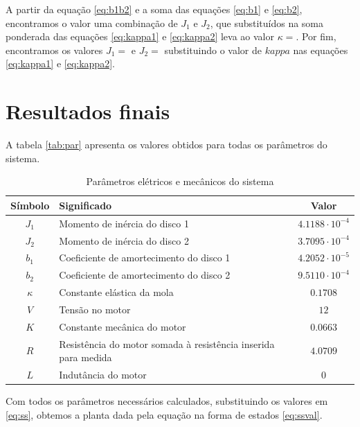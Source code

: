 \documentclass{article}
\begin{document}
A partir da equação \ref{eq:b1b2} e a soma das equações \ref{eq:b1} e \ref{eq:b2}, encontramos o valor uma combinação de $J_1$ e $J_2$, que substituídos na soma ponderada das equações \ref{eq:kappa1} e \ref{eq:kappa2} leva ao valor $\kappa=%
$. Por fim, encontramos os valores $J_1=%
$ e $J_2=%
$ substituindo o valor de $kappa$ nas equações \ref{eq:kappa1} e \ref{eq:kappa2}.

\section{Resultados finais}
A tabela \ref{tab:par} apresenta os valores obtidos para todas os parâmetros do sistema.
\begin{table}[H]
	\centering
	\caption{Parâmetros elétricos e mecânicos do sistema}
	\label{tab:valores}
	\begin{tabular}{|c|l|c|}
		\hline Símbolo & Significado & Valor \\ 
		\hline $J_1$ & Momento de inércia do disco 1 & $4.1188\cdot10^{-4}$\\ 
		\hline $J_2$ & Momento de inércia do disco 2 & $3.7095\cdot10^{-4}$\\
		\hline $b_1$ & Coeficiente de amortecimento do disco 1 & $4.2052\cdot10^{-5}$\\
		\hline $b_2$ & Coeficiente de amortecimento do disco 2 & $9.5110\cdot10^{-4}$\\ 	 
		\hline $\kappa$ & Constante elástica da mola & $0.1708$\\ 
		\hline $V$ & Tensão no motor & $12$\\ 
		\hline $K$ & Constante mecânica do motor & $0.0663$\\ 
		\hline $R$ & Resistência do motor somada à resistência inserida para medida & $4.0709$ \\
		\hline $L$ & Indutância do motor & $0$ \\ 	
		\hline 
	\end{tabular} 
\end{table}

Com todos os parâmetros necessários calculados, substituindo os valores em \ref{eq:ss}, obtemos a planta dada pela equação na forma de estados \ref{eq:ssval}.
\end{document}
